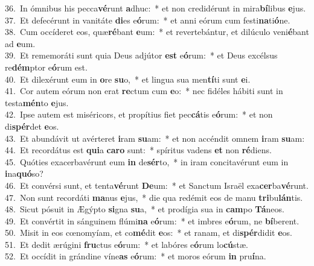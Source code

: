 {36.~}In ómnibus his pecca\textbf{vé}runt \textbf{a}dhuc:~* et non credidérunt in mira\textbf{bí}libus \textbf{e}jus.\\
{37.~}Et defecérunt in vanitáte \textbf{di}es e\textbf{ó}rum:~* et anni eórum cum festi\textbf{na}ti\textbf{ó}ne.\\
{38.~}Cum occíderet eos, quæ\textbf{ré}bant \textbf{e}um:~* et revertebántur, et dilúculo veni\textbf{é}bant ad \textbf{e}um.\\
{39.~}Et rememoráti sunt quia Deus adjútor \textbf{est} e\textbf{ó}rum:~* et Deus excélsus re\textbf{dém}ptor e\textbf{ó}rum est.\\
{40.~}Et dilexérunt eum in \textbf{o}re \textbf{su}o,~* et lingua sua men\textbf{tí}ti sunt \textbf{e}i.\\
{41.~}Cor autem eórum non erat \textbf{re}ctum cum \textbf{e}o:~* nec fidéles hábiti sunt in testa\textbf{mén}to \textbf{e}jus.\\
{42.~}Ipse autem est miséricors, et propítius fiet pec\textbf{cá}tis e\textbf{ó}rum:~* et non di\textbf{spér}det \textbf{e}os.\\
{43.~}Et abundávit ut avérteret \textbf{i}ram \textbf{su}am:~* et non accéndit omnem \textbf{i}ram \textbf{su}am:\\
{44.~}Et recordátus est \textbf{qui}a \textbf{ca}\textbf{ro} sunt:~* spíritus vadens \textbf{et} non \textbf{ré}diens.\\
{45.~}Quóties exacerbavérunt eum \textbf{in} de\textbf{sér}to,~* in iram concitavérunt eum in \textbf{i}na\textbf{quó}so?\\
{46.~}Et convérsi sunt, et tenta\textbf{vé}runt \textbf{De}um:~* et Sanctum Israël exa\textbf{cer}ba\textbf{vé}runt.\\
{47.~}Non sunt recordáti \textbf{ma}nus \textbf{e}jus,~* die qua redémit eos de manu \textbf{tri}bu\textbf{lán}tis.\\
{48.~}Sicut pósuit in Ægýpto \textbf{si}gna \textbf{su}a,~* et prodígia sua in \textbf{cam}po \textbf{Tá}neos.\\
{49.~}Et convértit in sánguinem flúmi\textbf{na} e\textbf{ó}rum:~* et imbres e\textbf{ó}rum, ne \textbf{bí}berent.\\
{50.~}Misit in eos cœnomyíam, et co\textbf{mé}dit \textbf{e}os:~* et ranam, et di\textbf{spér}didit \textbf{e}os.\\
{51.~}Et dedit ærúgini \textbf{fru}ctus e\textbf{ó}rum:~* et labóres e\textbf{ó}rum lo\textbf{cú}stæ.\\
{52.~}Et occídit in grándine víne\textbf{as} e\textbf{ó}rum:~* et moros eórum \textbf{in} pru\textbf{í}na.\\
